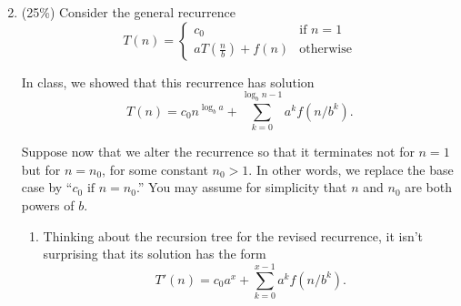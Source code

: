\documentclass[11pt]{article}
\begin{document}
\begin{enumerate}
\setcounter{enumi}{1}
\item (25\%)
Consider the general recurrence
\[
T(n) = \left\{
\begin{array}{cl}
c_0                     & \textrm{if\ }      n = 1 \\
a T(\frac{n}{b}) + f(n) & \textrm{otherwise}
\end{array}
\right.
\]

\noindent
In class, we showed that this recurrence has solution
\[
T(n) = c_0 n^{\log_b a} + \sum_{k = 0}^{\log_b n - 1} a^k f(n/b^k) .
\]

Suppose now that we alter the recurrence so that it terminates not for
$n = 1$ but for $n = n_0$, for some constant $n_0 > 1$.  In other
words, we replace the base case by ``$c_0 \textrm{\ if\ } n =
n_0$.'' You may assume for simplicity that $n$ and $n_0$ are both
powers of $b$.


\begin{enumerate}
\item
Thinking about the recursion tree for the revised recurrence, it isn't
surprising that its solution has the form
\[
T'(n) = c_0 a^{x} + \sum_{k = 0}^{x - 1} a^k f(n/b^k) .
\]


\end{enumerate}
\end{enumerate}
\end{document}
